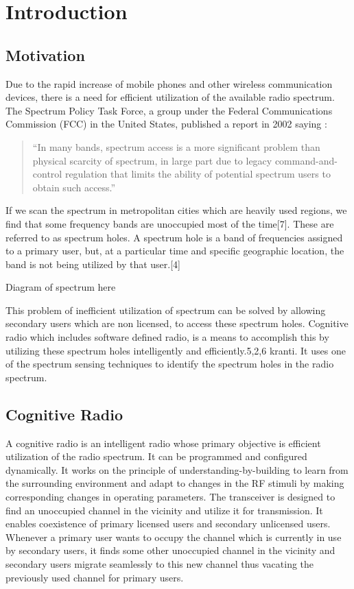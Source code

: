 \chapter{Introduction}

\section{Motivation}
Due to the rapid increase of mobile phones and other wireless communication devices, 
there is a need for efficient utilization of the available radio spectrum.
The Spectrum Policy Task Force, a group under the Federal Communications  
Commission (FCC) in the United States, published a report in 2002 saying \cite{repFCC}: 
\begin{quote}
``In many bands, spectrum access is a more significant problem than physical
scarcity of spectrum, in large part due to legacy command-and-control regulation that limits the ability of potential spectrum users to obtain such access.''
\end{quote}
If we scan the spectrum in metropolitan cities which are heavily used regions, we find that some frequency bands are unoccupied most of the time[7]. These are referred to as spectrum holes. A spectrum hole is a band of frequencies assigned to a primary user, but, at a particular time and specific geographic location, the band is not being utilized by that user.[4]


Diagram of spectrum here 

This problem of inefficient utilization of spectrum can be solved by allowing secondary users which are non licensed, to access these spectrum holes. Cognitive radio which includes software defined radio, is a means to accomplish this by utilizing these spectrum holes intelligently and efficiently.5,2,6 kranti. It uses one of the spectrum sensing techniques to identify the spectrum holes in the radio spectrum.


\section{Cognitive Radio}
A cognitive radio is an intelligent radio whose primary objective is efficient utilization of the radio spectrum. It can be programmed and configured dynamically. It works on the principle of understanding-by-building to learn from the surrounding environment and adapt to changes in the RF stimuli by making corresponding changes in operating parameters. The transceiver is designed to find an unoccupied channel in the vicinity and utilize it for transmission. It enables coexistence of primary licensed users and secondary unlicensed users. Whenever a primary user wants to occupy the channel which is currently in use by secondary users, it finds some other unoccupied channel in the vicinity and secondary users migrate seamlessly to this new channel thus vacating the previously used channel for primary users.  

